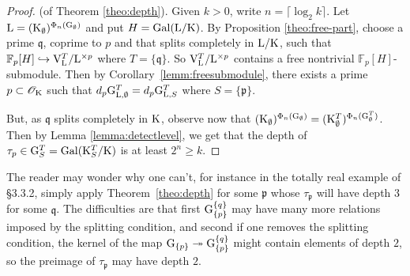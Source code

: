 \documentclass[12pt,a4paper,twoside,english]{smfart}
\def\fq{{\mathbb F}}
\def\p{{\mathfrak p}}
\def\q{{\mathfrak q}}
\def\G{{\rm G}}
\def\K{{\rm K}}
\def\L{{\rm L}}
\def\V{{\rm V}}
\def\O{{\mathcal O}}
\def\Gal{{\rm Gal}}
\begin{document}
\begin{proof}(of Theorem \ref{theo:depth}).
 Given $k>0$, write $n=\lceil \log_2k \rceil$.
 Let $\L=(\K_\emptyset)^{\Phi_n(\G_\emptyset)}$ and put $H=\Gal(\L/\K)$. By Proposition \ref{theo:free-part}, choose a prime $\q$, coprime to $p$ and that splits completely in $\L/\K$, such that $\fq_p[H] \hookrightarrow \V_{\L}^T/\L^{\times p}$ where $T=\{\q\}$. 
So $\V_\L^T/\L^{\times p}$ contains a free nontrivial $\fq_p[H]$-submodule.  Then by Corollary~\ref{lemm:freesubmodule}, there exists a prime $\p \subset \O_\K$  such that  $d_p \G_{\L,\emptyset}^T=d_p \G_{\L,S}^T$ where $S=\{\p\}$.

But, as $\q$ splits completely in $\/\K$, observe now that  $(\K_\emptyset)^{\Phi_n(\G_\emptyset)}=(\K_\emptyset^T)^{\Phi_n(\G_\emptyset^T)}$.
Then by Lemma \ref{lemma:detectlevel}, we get that the depth of $\tau_\p \in \G_S^T=\Gal(\K_S^T/\K)$ is at least $2^n \geq k$.
\end{proof}



\begin{rema} The reader may wonder why one can't, for instance in the totally real example of \S 3.3.2, simply apply Theorem~\ref{theo:depth}
for some $\p$ whose $\tau_\p$ will have depth $3$ for some $\q$. The difficulties are that first $\G^{ \{\q\} }_{ \{\p\} }$ may have many more
relations imposed by the splitting condition, and second if one removes the splitting condition,  the kernel of the map
$\G_{ \{\p\} }    \twoheadrightarrow \G^{ \{\q\} }_{ \{\p\} }$ might contain elements of depth $2$, so  the preimage of $\tau_\p$ 
may have depth $2$.
\end{rema}










\end{document}
